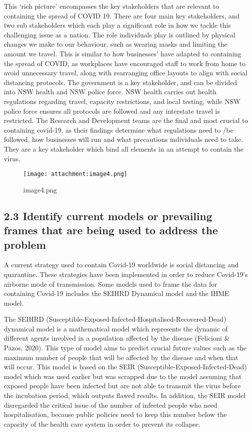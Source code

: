 \documentclass[11pt]{article}
\begin{document}
    This `rich picture' encompasses the key stakeholders that are relevant
to containing the spread of COVID 19. There are four main key
stakeholders, and two sub stakeholders which each play a significant
role in how we tackle this challenging issue as a nation. The role
individuals play is outlined by physical changes we make to our
behaviour, such as wearing masks and limiting the amount we travel. This
is similar to how businesses' have adapted to containing the spread of
COVID, as workplaces have encouraged staff to work from home to avoid
unnecessary travel, along with rearranging office layouts to align with
social distancing protocols. The government is a key stakeholder, and
can be divided into NSW health and NSW police force. NSW health carries
out health regulations regarding travel, capacity restrictions, and
local testing, while NSW police force ensures all protocols are followed
and any interstate travel is restricted. The Research and Development
teams are the final and most crucial to containing covid-19, as their
findings determine what regulations need to /be followed, how businesses
will run and what precautions individuals need to take. They are a key
stakeholder which bind all elements in an attempt to contain the virus.

    \begin{figure}
\centering
\texttt{[image: attachment:image4.png]}
\caption{image4.png}
\end{figure}

    \hypertarget{identify-current-models-or-prevailing-frames-that-are-being-used-to-address-the-problem}{%
\subsection{2.3 Identify current models or prevailing frames that are
being used to address the
problem}\label{identify-current-models-or-prevailing-frames-that-are-being-used-to-address-the-problem}}

    A current strategy used to contain Covid-19 worldwide is social
distancing and quarantine. These strategies have been implemented in
order to reduce Covid-19's airborne mode of transmission. Some models
used to frame the data for containing Covid-19 includes the SEIHRD
Dynamical model and the IHME model.

    The SEIHRD (Susceptible-Exposed-Infected-Hospitalised-Recovered-Dead)
dynamical model is a mathematical model which represents the dynamic of
different agents involved in a population affected by the disease
(Felicioni \& Pazos, 2020). This type of model aims to predict crucial
future values such as the maximum number of people that will be affected
by the disease and when that will occur. This model is based on the SEIR
(Susceptible-Exposed-Infected-Dead) model which was used earlier but was
scrapped due to the model assuming that exposed people have been
infected but are not able to transmit the virus before the incubation
period, which outputs flawed results. In addition, the SEIR model
disregarded the critical issue of the number of infected people who need
hospitalisation, because public policies need to keep this number below
the capacity of the health care system in order to prevent its collapse.
\end{document}
